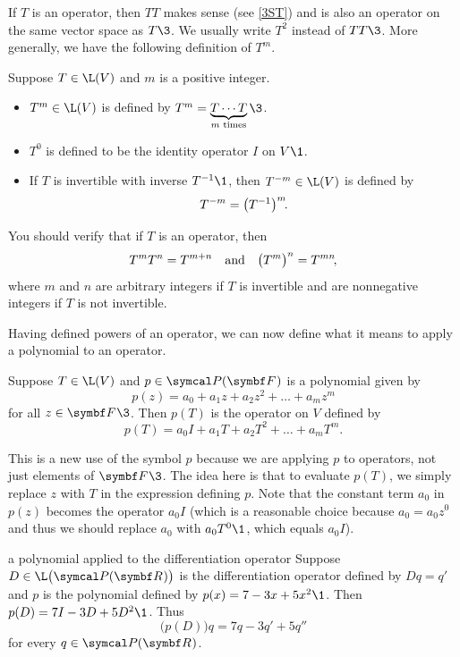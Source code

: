 If $T$ is an operator, then $TT$ makes sense (see \ref{3ST}) and is also an operator on the same vector space as $T\3$.  We usually write $T^2$ instead of $TT\3$.  More generally, we have the following definition of $T^m\!$.

{Suppose $T \in \L(V)$ and $m$ is a positive integer.
\begin{itemize} %
\item
$T^m \in \L(V)$ is defined by
$
T^m = \underbrace{T \dotsm T}_{m \text{\ times}}\3$.
\item
$T^0$ is defined to be the identity operator $I$ on $V\1$.
\item
If $T$ is invertible with inverse $T^{-1}\1$, then $T^{-m} \in \L(V)$ is defined by
\[
T^{-m} = \paren[\big]{T^{-1}}^m\!.
\]
\end{itemize}}

You should verify that if $T$ is an operator, then
\[
T^m T^n = T^{m+n} \andd \paren[\big]{T^m}^n = T^{mn}\!,
\]
where $m$ and $n$ are arbitrary integers if $T$ is invertible and are nonnegative integers if $T$ is not invertible.

Having defined powers of an operator, we can now define what it means to apply a polynomial to an operator.

{Suppose $T \in \L(V)$ and $p \in \P(\F{})$ is a
polynomial given by
\[
p(z) = a_0 + a_1 z + a_2 z^2 + \dots + a_m z^m
\]
for all $z \in \F{}\3$. Then $p(T)$ is the operator on $V$ defined by
\[
p(T) = a_0 I + a_1 T + a_2 T^2 + \dots + a_m T^m\!.
\]}

This is a new use of the symbol $p$ because we are applying $p$ to operators, not just elements of $\F{}\3$. The idea here is that to evaluate $p(T)$, we simply replace $z$ with $T$ in the expression defining $p$. Note that the constant term $a_0$ in $p(z)$ becomes the operator $a_0 I$ \big(which is a reasonable choice because $a_0 = a_0 z^0$ and thus we should replace $a_0$ with $a_0 T^0\1$, which equals $a_0 I$\big).

\pagebreak[3]

\begin{example}{a polynomial applied to the differentiation operator}
Suppose $D \in \L\bigl(\P(\R{})\bigr)$ is the differentiation operator defined by $Dq = q'$ and $p$ is the polynomial defined by $p(x) = 7 - 3x + 5x^2\1$. Then $p(D) = 7I - 3D + 5D^2\1$. Thus
\[
\bigl(p(D)\bigr)q  = 7q - 3q' + 5q''
\]
for every $q \in \P(\R{})$.
\end{example}

